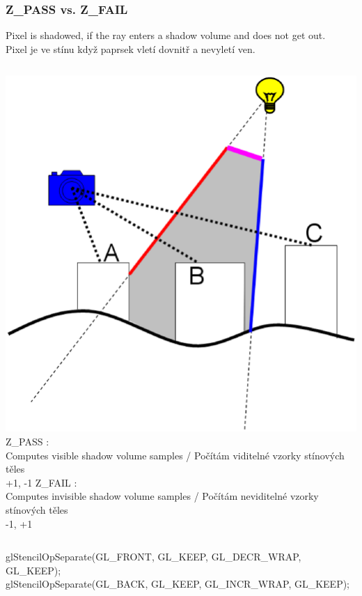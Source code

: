 \begin{frame}\frametitle{Z\_PASS vs. Z\_FAIL}
Pixel is shadowed, if the ray {\color{red}enters} a shadow volume and does not {\color{blue}get out}.\\
Pixel je ve stínu když paprsek vletí {\color{red}dovnitř} a nevyletí {\color{blue}ven}.
\begin{columns}[c]
  \includegraphics[width=\textwidth]{pics/shadows/shadowVolumes/ShadowVolume.eps}
  Z\_PASS : \\
  Computes visible shadow volume samples / Počítám viditelné vzorky stínových těles \\
  {\color{red} +1}, {\color{blue} -1}
  \vfill
  Z\_FAIL : \\
  Computes invisible shadow volume samples / Počítám neviditelné vzorky stínových těles \\
  {\color{red} -1}, {\color{blue} +1}
\end{columns}
\pause\vfill
glStencilOpSeparate(GL\_FRONT, GL\_KEEP, GL\_DECR\_WRAP, GL\_KEEP);\\
glStencilOpSeparate(GL\_BACK, GL\_KEEP, GL\_INCR\_WRAP, GL\_KEEP);    
\end{frame}

